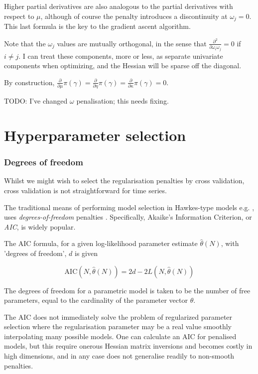\documentclass[11pt]{article}
\begin{document}
Higher partial derivatives are also analogous to the partial derivatives
with respect to \(\mu\), although of course the penalty introduces a
discontinuity at \(\omega_j=0\). This last formula is the key to the
gradient ascent algorithm.

Note that the \(\omega_j\) values are mutually orthogonal, in the sense
that \({ \scriptstyle \frac{\partial^2}{\partial\omega_i\omega_j}} =0\)
if \(i\ne j\). I can treat these components, more or less, as separate
univariate components when optimizing, and the Hessian will be sparse
off the diagonal.

By construction,
\({ \scriptstyle \frac{\partial}{\partial\mu} }\pi(\gamma) = { \scriptstyle \frac{\partial}{\partial\eta} }\pi(\gamma) = { \scriptstyle \frac{\partial}{\partial\kappa} }\pi(\gamma) = 0\).

TODO: I've changed \(\omega\) penalisation; this needs fixing.

    \section{Hyperparameter selection}\label{hyperparameter-selection}

    \subsubsection{Degrees of freedom}\label{degrees-of-freedom}

Whilst we might wish to select the regularisation penalties by cross
validation, cross validation is not straightforward for time series.

The traditional means of performing model selection in Hawkes-type
models e.g. \cite{ogata_estimation_1983}, uses \emph{degrees-of-freedom}
penalties \cite{efron_how_1886}. Specifically, Akaike's
\cite{akaike_likelihood_1981} Information Criterion, or \emph{AIC}, is
widely popular.

The AIC formula, for a given log-likelihood parameter estimate
\(\hat{\theta}(N)\), with 'degrees of freedom', \(d\) is given

\[\mathrm{AIC}(N,\hat{\theta}(N))=2d-2L(N,\hat{\theta}(N))\]

The degrees of freedom for a parametric model is taken to be the number
of free parameters, equal to the cardinality of the parameter vector
\(\theta\).

    The AIC does not immediately solve the problem of regularized parameter
selection where the regularisation parameter may be a real value
smoothly interpolating many possible models. One can calculate an AIC
for penalised models, but this require onerous Hessian matrix inversions
and becomes costly in high dimensions, and in any case does not
generalise readily to non-smooth penalties.
\cite{konishi_information_2008}
\end{document}
